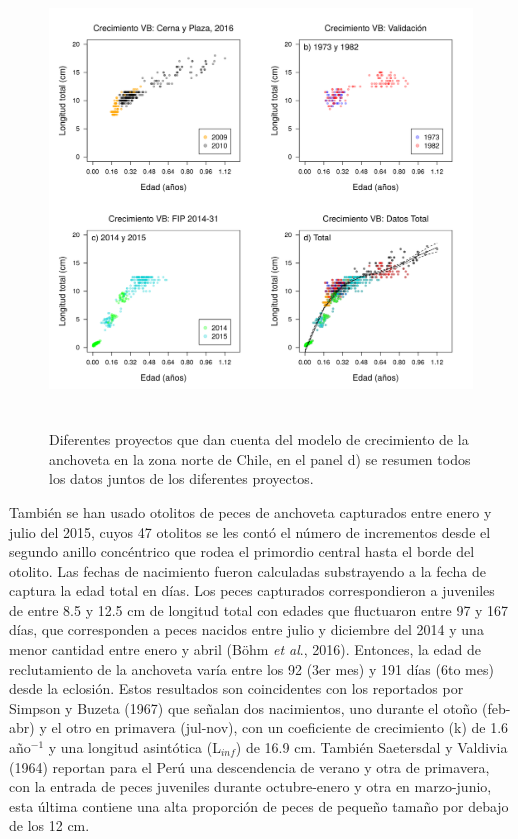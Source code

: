 \documentclass[letter,11pt]{article}
\begin{document}
\vspace{0.5cm}
\begin{figure}[htb!]
 \centering
 \includegraphics[width=16cm,height=12cm]{Figuras/figura3.pdf}
 \caption{Diferentes proyectos que dan cuenta del modelo de crecimiento de la anchoveta en la zona norte de Chile, en el panel d) se resumen todos los datos juntos de los diferentes proyectos.}
 \label{Fig3}
\end{figure}

Tambi\'en se han usado otolitos de peces de anchoveta capturados entre
enero y julio del 2015, cuyos 47 otolitos se les cont\'o el n\'umero de
incrementos desde el segundo anillo conc\'entrico que rodea el primordio
central hasta el borde del otolito. Las fechas de nacimiento fueron
calculadas substrayendo a la fecha de captura la edad total en d\'ias. Los
peces capturados correspondieron a juveniles de entre 8.5 y 12.5 cm de
longitud total con edades que fluctuaron entre 97 y 167 d\'ias, que
corresponden a peces nacidos entre julio y diciembre del 2014 y una
menor cantidad entre enero y abril (B\"ohm \textit{et al}., 2016).
Entonces, la edad de reclutamiento de la anchoveta var\'ia entre los 92
(3er mes) y 191 d\'ias (6to mes) desde la eclosi\'on. Estos resultados son
coincidentes con los reportados por Simpson y Buzeta (1967) que se\~{n}alan
dos nacimientos, uno durante el oto\~{n}o (feb-abr) y el otro en primavera
(jul-nov), con un coeficiente de crecimiento (k) de 1.6 a\~{n}o$^{-1}$ y
una longitud asint\'otica (L$_{inf}$) de 16.9 cm. Tambi\'en Saetersdal y
Valdivia (1964) reportan para el Per\'u una descendencia de verano y otra
de primavera, con la entrada de peces juveniles durante octubre-enero y
otra en marzo-junio, esta \'ultima contiene una alta proporci\'on de peces
de peque\~{n}o tama\~{n}o por debajo de los 12 cm.
\end{document}

